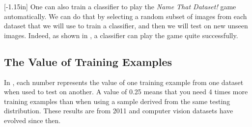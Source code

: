 [-1.15in]
One can also train a classifier to play the {\em Name That Dataset!} game automatically. We can do that by selecting a random subset of images from each dataset that we will use to train a classifier, and then we will test on new unseen images. Indeed, as shown in \cite{Torralba2011}, a classifier can play the game quite successfully. 






\subsection{The Value of Training Examples}

In \tab{\ref{table:market_bias}}, each number represents the value of one training example from one dataset when used to test on another. A value of 0.25 means that you need 4 times more training examples than when using a sample derived from the same testing distribution. These results are from 2011 \cite{Torralba2011} and computer vision datasets have evolved since then.

